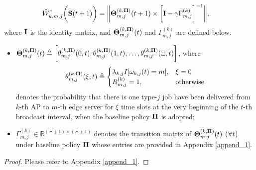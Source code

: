 \begin{lemma}
    \label{lemma:w_ap}
    \begin{align}
        &\tilde{W}^{\dagger}_{k,m,j}\bigg(\mathbf{S}(t+1)\bigg) =
        \bigg\|
            \boldsymbol{\Theta}^{(k, \boldsymbol{\Pi})}_{m,j}(t+1) \times
            \bigg[
                \mathbf{I} - \gamma \Gamma^{(k)}_{m,j}
            \bigg]^{-1}
        \bigg\|,
        \label{w_ap}
    \end{align}
    where $\mathbf{I}$ is the identity matrix, and $\boldsymbol{\Theta}^{(k, \boldsymbol{\Pi})}_{m,j}(t)$ and $\Gamma^{(k)}_{m,j}$ are defined below.
    \begin{itemize}
        \item {\small $\boldsymbol{\Theta}^{(k,\boldsymbol{\Pi})}_{m,j}(t) \triangleq \bigg[
            \theta^{(k,\boldsymbol{\Pi})}_{m,j}(0,t),
            \theta^{(k,\boldsymbol{\Pi})}_{m,j}(1,t),
            \dots,
            \theta^{(k,\boldsymbol{\Pi})}_{m,j}(\Xi,t)
            \bigg]$},
        where 
        \begin{align*}
            \theta^{(k,\boldsymbol{\Pi})}_{m,j}(\xi,t) \triangleq 
            \begin{cases}
                \lambda_{k,j} I[\omega_{k,j}(t)=m], & \xi=0
                \\
                R^{(k)}_{m,j} = 1, & \text{otherwise}
            \end{cases}
        \end{align*}
        denotes the probability that there is one type-$j$ job have been delivered from $k$-th AP to $m$-th edge server for $\xi$ time slots at the very beginning of the $t$-th broadcast interval, when the baseline policy $\boldsymbol{\Pi}$ is adopted;
        \item $\Gamma^{(k)}_{m,j} \in \mathbb{R}^{(\Xi+1)\times(\Xi+1)}$ denotes the transition matrix of $\boldsymbol{\Theta}^{(k,\boldsymbol{\Pi})}_{m,j}(t)$ ($\forall t$) under baseline policy $\boldsymbol{\Pi}$ whose entries are provided in Appendix \ref{append_1}.
    \end{itemize}
\end{lemma}
\begin{proof}
    Please refer to Appendix \ref{append_1}.
\end{proof}

